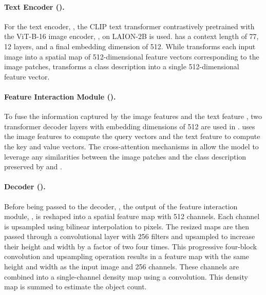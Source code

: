 \documentclass{bmvc2k}
\begin{document}
\paragraph{Text Encoder ().}
For the text encoder, , the CLIP text transformer \cite{Radford2021LearningTV, ilharco_gabriel_2021_5143773} contrastively pretrained with the ViT-B-16 image encoder, , on LAION-2B \cite{schuhmann2022laionb} is used.  has a context length of 77, 12 layers, and a final embedding dimension of 512. While  transforms each input image into a spatial map of 512-dimensional feature vectors corresponding to the image patches,  transforms a class description into a single 512-dimensional feature vector. 
\paragraph{Feature Interaction Module ().}
To fuse the information captured by the image features  and the text feature , two transformer decoder layers with embedding dimensions of 512 are used in .  uses the image features  to compute the query vectors and the text feature  to compute the key and value vectors. The cross-attention mechanisms in  allow the model to leverage any similarities between the image patches and the class description preserved by  and . 
\paragraph{Decoder ().}
Before being passed to the decoder, , the output of the feature interaction module, , is reshaped into a spatial feature map with 512 channels. Each channel is upsampled using bilinear interpolation to  pixels. The resized maps are then passed through a convolutional layer with 256 filters and upsampled to increase their height and width by a factor of two four times. This progressive four-block convolution and upsampling operation results in a feature map with the same height and width as the input image and 256 channels. These channels are combined into a single-channel density map using a  convolution. This density map is summed to estimate the object count. 
\end{document}
